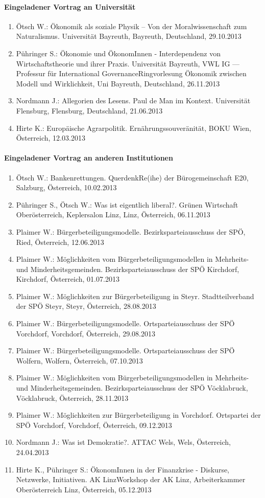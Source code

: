 \paragraph{Eingeladener Vortrag an Universität}
\begin{enumerate}
	\item Ötsch W.: Ökonomik als soziale Physik – Von der Moralwissenschaft zum Naturalismus. Universität Bayreuth, Bayreuth, Deutschland, 29.10.2013
	\item Pühringer S.: Ökonomie und ÖkonomInnen - Interdependenz von Wirtschaftstheorie und ihrer Praxis. Universität Bayreuth, VWL IG — Professur für International GovernanceRingvorlesung Ökonomik zwischen Modell und Wirklichkeit, Uni Bayreuth, Deutschland, 26.11.2013
	\item Nordmann J.: Allegorien des Lesens. Paul de Man im Kontext. Universität Flensburg, Flensburg, Deutschland, 21.06.2013
	\item Hirte K.: Europäische Agrarpolitik. Ernährungssouveränität, BOKU Wien, Österreich, 12.03.2013
\end{enumerate}
\paragraph{Eingeladener Vortrag an anderen Institutionen}
\begin{enumerate}
	\item Ötsch W.: Bankenrettungen. QuerdenkRe(ihe) der Bürogemeinschaft E20, Salzburg, Österreich, 10.02.2013
	\item Pühringer S., Ötsch W.: Was ist eigentlich liberal?. Grünen Wirtschaft Oberösterreich, Keplersalon Linz, Linz, Österreich, 06.11.2013
	\item Plaimer W.: Bürgerbeteiligungsmodelle. Bezirksparteiausschuss  der SPÖ, Ried, Österreich, 12.06.2013
	\item Plaimer W.: Möglichkeiten vom Bürgerbeteiligungsmodellen in Mehrheits- und Minderheitsgemeinden. Bezirksparteiausschuss der SPÖ Kirchdorf, Kirchdorf, Österreich, 01.07.2013
	\item Plaimer W.: Möglichkeiten zur Bürgerbeteiligung in Steyr. Stadtteilverband  der SPÖ Steyr, Steyr, Österreich, 28.08.2013
	\item Plaimer W.: Bürgerbeteiligungsmodelle. Ortsparteiausschuss  der SPÖ Vorchdorf, Vorchdorf, Österreich, 29.08.2013
	\item Plaimer W.: Bürgerbeteiligungsmodelle. Ortsparteiausschuss der SPÖ Wolfern, Wolfern, Österreich, 07.10.2013
	\item Plaimer W.: Möglichkeiten vom Bürgerbeteiligungsmodellen in Mehrheits- und Minderheitsgemeinden. Bezirksparteiausschuss der SPÖ Vöcklabruck, Vöcklabruck, Österreich, 28.11.2013
	\item Plaimer W.: Möglichkeiten zur Bürgerbeteiligung in Vorchdorf. Ortspartei  der SPÖ Vorchdorf, Vorchdorf, Österreich, 09.12.2013
	\item Nordmann J.: Was ist Demokratie?. ATTAC Wels, Wels, Österreich, 24.04.2013
	\item Hirte K., Pühringer S.: ÖkonomInnen in der Finanzkrise - Diskurse, Netzwerke, Initiativen. AK LinzWorkshop der AK Linz, Arbeiterkammer Oberösterreich Linz, Österreich, 05.12.2013
\end{enumerate}
